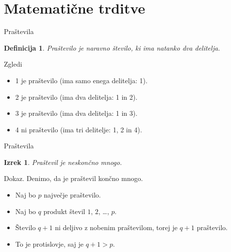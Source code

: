 \documentclass{beamer}
\newtheorem{definicija}{Definicija}
\newtheorem{izrek}{Izrek}
\begin{document}
\section{Matematične trditve}


  
  \begin{frame}
      {Praštevila}
         
         \begin{definicija}
            Praštevilo je naravno število, ki ima natanko dva delitelja.
         \end{definicija}
      
      \begin{exampleblock}
         {Zgledi}
               
               \begin{itemize}
                  \item 1 je praštevilo (ima samo enega delitelja: 1).
                  \item 2 je praštevilo (ima dva delitelja: 1 in 2).
                  \item 3 je praštevilo (ima dva delitelja: 1 in 3).
                  \item 4 ni praštevilo (ima tri delitelje: 1, 2 in 4).
               \end{itemize}
      \end{exampleblock}
  \end{frame}


\begin{frame}
      {Praštevila}
         
         \begin{izrek}
            Praštevil je neskončno mnogo.
         \end{izrek}
         
         \begin{block}{Dokaz.}
            Denimo, da je praštevil končno mnogo.
               
               \begin{itemize}
                  \item Naj bo $p$ največje praštevilo.
                  \item Naj bo $q$ produkt števil $1$, $2$, \dots, $p$.
                  \item Število $q+1$ ni deljivo z nobenim praštevilom, torej je $q+1$ praštevilo.
                  \item To je protislovje, saj je $q+1>p$.
               \end{itemize}
         \end{block}
   
\end{frame}
\end{document}
